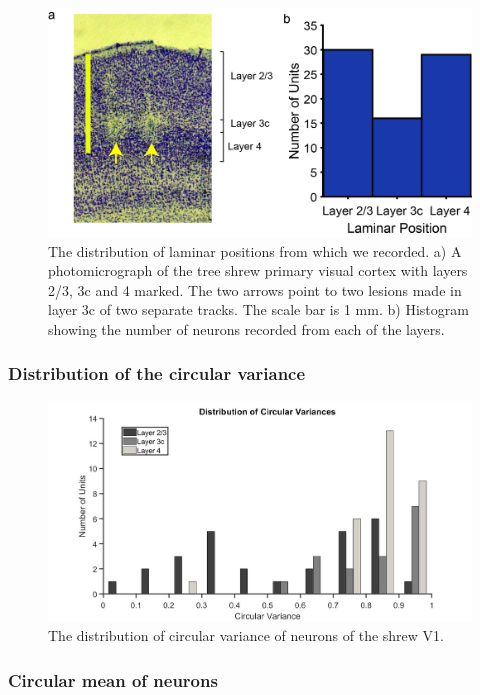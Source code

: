 	\begin{figure}[H]
	
	\includegraphics[width=\linewidth]{ShrewV1/LaminarPosition.jpg}
	\caption{The distribution of laminar positions from which we recorded. a) A photomicrograph of the tree shrew primary visual cortex with layers 2/3, 3c and 4 marked. The two arrows point to two lesions made in layer 3c of two separate tracks. The scale bar is 1 mm. b) Histogram showing the number of neurons recorded from each of the layers.}
	\label{fig:lp}
\end{figure} 

\subsubsection{Distribution of the circular variance}

	\begin{figure}[H]
	
	\includegraphics[width=\linewidth]{ShrewV1/cv_lamina_2_bw.jpg}
	\caption{The distribution of circular variance of neurons of the shrew V1.}
	\label{fig:cv}
\end{figure} 

\subsubsection{Circular mean of neurons}

